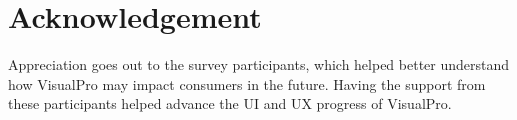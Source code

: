 \documentclass[12pt]{report} %
\begin{document}
	\chapter*{Acknowledgement}
		Appreciation goes out to the survey participants, which helped better understand how VisualPro may impact consumers in the future. Having the support from these participants helped advance the UI and UX progress of VisualPro.

\clearpage
\nocite{*}
\small{
}


\end{document}
